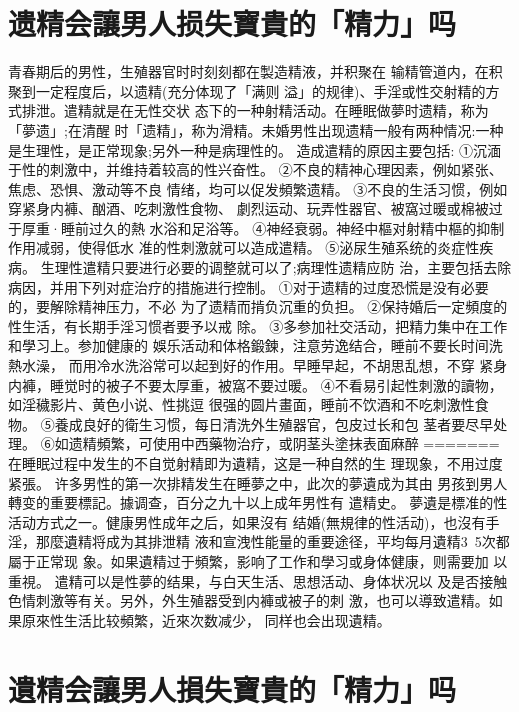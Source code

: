 \documentclass[12pt,UTF8]{ctexbook}
\begin{document}
\section{遗精会讓男人损失寶貴的「精力」吗}

青春期后的男性，生殖器官时时刻刻都在製造精液，并积聚在
输精管道内，在积聚到一定程度后，以遗精(充分体现了「满则
溢」的规律)、手淫或性交射精的方式排泄。遣精就是在无性交状
态下的一种射精活动。在睡眠做夢时遗精，称为「夢遗」;在清醒
时「遗精」，称为滑精。未婚男性出现遗精一般有两种情况:一种
是生理性，是正常现象;另外一种是病理性的。
造成遣精的原因主要包括:
①沉湎于性的刺激中，并维持着较高的性兴奋性。
②不良的精神心理因素，例如紧张、焦虑、恐惧、激动等不良
情绪，均可以促发頻繁遗精。
③不良的生活习惯，例如穿紧身内褲、酗酒、吃刺激性食物、
劇烈运动、玩弄性器官、被窩过暖或棉被过于厚重·睡前过久的熱
水浴和足浴等。
④神经衰弱。神经中樞对射精中樞的抑制作用减弱，使得低水
准的性刺激就可以造成遣精。
⑤泌尿生殖系统的炎症性疾病。
生理性遣精只要进行必要的调整就可以了;病理性遗精应防
治，主要包括去除病因，并用下列对症治疗的措施进行控制。
①对于遗精的过度恐慌是没有必要的，要解除精神压力，不必
为了遗精而掯负沉重的负担。
②保持婚后一定頻度的性生活，有长期手淫习惯者要予以戒
除。
③多参加社交活动，把精力集中在工作和學习上。参加健康的
娛乐活动和体格鍛鍊，注意劳逸结合，睡前不要长时间洗熱水澡，
而用冷水洗浴常可以起到好的作用。早睡早起，不胡思乱想，不穿
紧身内褲，睡觉时的被子不要太厚重，被窩不要过暖。
④不看易引起性刺激的讀物，如淫穢影片、黄色小说、性挑逗
很强的圆片畫面，睡前不饮酒和不吃刺激性食物。
⑤養成良好的衛生习惯，每日清洗外生殖器官，包皮过长和包
茎者要尽早处理。
⑥如遗精頻繁，可使用中西藥物治疗，或阴茎头塗抹表面麻醉
=======
在睡眠过程中发生的不自觉射精即为遺精，这是一种自然的生
理现象，不用过度紧張。
许多男性的第一次排精发生在睡夢之中，此次的夢遺成为其由
男孩到男人轉变的重要標記。據调查，百分之九十以上成年男性有
遣精史。
夢遺是標准的性活动方式之一。健康男性成年之后，如果沒有
结婚(無規律的性活动)，也沒有手淫，那麼遺精将成为其排泄精
液和宣洩性能量的重要途径，平均每月遺精3~5次都屬于正常现
象。如果遺精过于頻繁，影响了工作和學习或身体健康，则需要加
以重視。
遣精可以是性夢的结果，与白天生活、思想活动、身体状况以
及是否接触色情刺激等有关。另外，外生殖器受到内褲或被子的刺
激，也可以導致遣精。如果原來性生活比较頻繁，近來次数减少，
同样也会出现遺精。

\section{遺精会讓男人損失寶貴的「精力」吗}
\end{document}
